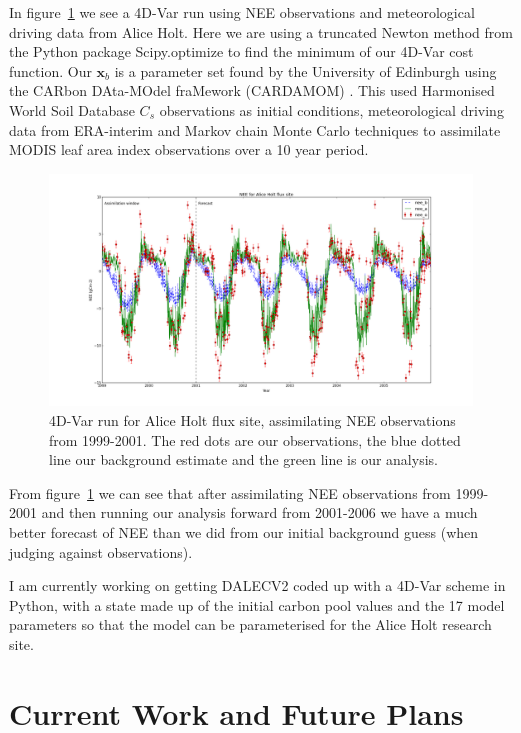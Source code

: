 \documentclass[11pt]{article}
\begin{document}
In figure~\ref{fig:4dvar} we see a 4D-Var run using NEE observations and meteorological driving data from Alice Holt. Here we are using a truncated Newton method \citep{Nocedal1999} from the Python package Scipy.optimize to find the minimum of our 4D-Var cost function. Our $\textbf{x}_b$ is a parameter set found by the University of Edinburgh using the CARbon DAta-MOdel fraMework (CARDAMOM) \citep{Exbrayat2015}. This used Harmonised World Soil Database $C_{s}$ observations as initial conditions, meteorological driving data from ERA-interim and Markov chain Monte Carlo techniques to assimilate MODIS leaf area index observations over a 10 year period. 

\begin{figure}[!hb]
    \centering
    \includegraphics[width=.9\textwidth]{ah_assim_edinpvals.png}
    \caption{4D-Var run for Alice Holt flux site, assimilating NEE observations from 1999-2001. The red dots are our observations, the blue dotted line our background estimate and the green line is our analysis.}
    \label{fig:4dvar}
\end{figure}

From figure~\ref{fig:4dvar} we can see that after assimilating NEE observations from 1999-2001 and then running our analysis forward from 2001-2006 we have a much better forecast of NEE than we did from our initial background guess (when judging against observations). 

I am currently working on getting DALECV2 coded up with a 4D-Var scheme in Python, with a state made up of the initial carbon pool values and the 17 model parameters so that the model can be parameterised for the Alice Holt research site.


\section{Current Work and Future Plans}
\end{document}
